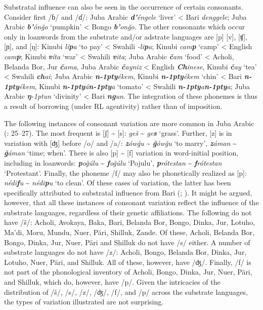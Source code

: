 \documentclass[output=paper]{langsci/langscibook}
\begin{document}
Substratal influence can also be seen in the occurrence of certain consonants. Consider first /ɓ/ and /ɗ/: Juba Arabic \textit{\textbf{d'}éngele} ‘liver’ < Bari \textit{denggele}; Juba Arabic \textit{\textbf{b'}ónǧo} ‘pumpkin’ < Bongo \textit{\textbf{b'}onǧo}. The other consonants which occur only in loanwords from the substrate and/or adstrate languages are [p] [v], [ʧ], [ɲ], and [ŋ]: Kinubi \textit{lí\textbf{p}a} ‘to pay’ < Swahili \textit{-li\textbf{p}a}; Kinubi \textit{cam\textbf{p}} ‘camp’ < English \textit{cam\textbf{p}}; Kinubi \textit{\textbf{v}íta} ‘war’ < Swahili \textit{\textbf{v}ita}; Juba Arabic \textit{\textbf{č}am} ‘food’ < Acholi, Belanda Bor, Jur \textit{\textbf{č}ama}, Juba Arabic \textit{\textbf{č}ayniz} < English \textit{\textbf{Ch}inese}, Kinubi \textit{\textbf{č}ay} ‘tea’ < Swahili \textit{\textbf{ch}ai}; Juba Arabic \textit{\textbf{n\kern -1pty}ékem}, Kinubi \textit{\textbf{n\kern -1pty}ékem} ‘chin’ < Bari \textit{\textbf{n\kern -1pty}ékem}, Kinubi \textit{\textbf{n\kern -1pty}á\textbf{n\kern -1pty}a} ‘tomato’ < Swahili \textit{\textbf{n\kern -1pty}a\textbf{n\kern -1pty}a}; Juba Arabic \textit{\textbf{ŋ}\kern -1ptun} ‘divinity’ < Bari \textit{\textbf{ng}un}. The integration of these phonemes is thus a result of borrowing (under RL agentivity) rather than of imposition.

  The following instances of consonant variation are more common in Juba Arabic (\citealt{Manfredi2017}: 25–27). The most frequent is [ʃ] {\textasciitilde} [s]: \textit{geš} {\textasciitilde} \textit{ge\textbf{s}} ‘grass’. Further, [z] is in variation with [ʤ] before /o/ and /a/: \textit{\textbf{z}ówǧu} {\textasciitilde} \textit{\textbf{ǧ}ówǧu} ‘to marry’, \textit{\textbf{z}áman} {\textasciitilde} \textit{\textbf{ǧ}áman} ‘time; when’. There is also [p] {\textasciitilde} [f] variation in word-initial position, including in loanwords: \textit{\textbf{p}oǧúlu} {\textasciitilde} \textit{\textbf{f}oǧúlu} ‘Pojulu’, \textit{\textbf{p}rótestan} {\textasciitilde} \textit{\textbf{f}rótestan} ‘Protestant’. Finally, the phoneme /f/ may also be phonetically realized as [p]: \textit{nédi\textbf{f}u} {\textasciitilde} \textit{nédi\textbf{p}u} ‘to clean’. Of these cases of variation, the latter has been specifically attributed to substratal influence from Bari (\citealt{Miller1989}; \citealt{Manfredi2017}). It might be argued, however, that all these instances of consonant variation reflect the influence of the substrate languages, regardless of their genetic affiliations. The following do not have /š/: Acholi, Avokaya, Baka, Bari, Belanda Bor, Bongo, Dinka, Jur, Lotuho, Ma'di, Moru, Mundu, Nuer, Päri, Shilluk, Zande. Of these, Acholi, Belanda Bor, Bongo, Dinka, Jur, Nuer, Päri and Shilluk do not have /s/ either. A number of substrate languages do not have /z/: Acholi, Bongo, Belanda Bor, Dinka, Jur, Lotuho, Nuer, Päri, and Shilluk. All of these, however, have /ʤ/. Finally, /f/ is not part of the phonological inventory of Acholi, Bongo, Dinka, Jur, Nuer, Päri, and Shilluk, which do, however, have /p/. Given the intricacies of the distribution of /š/, /s/, /z/, /ʤ/, /f/, and /p/ across the substrate languages, the types of variation illustrated are not surprising. 
\end{document}
